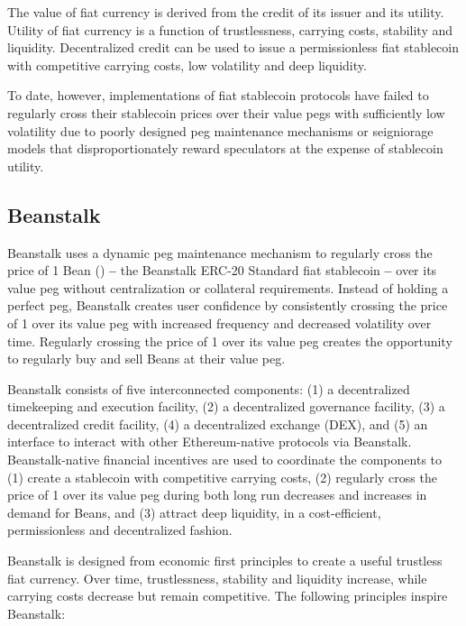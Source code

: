 \documentclass[tikz]{article}
\newcommand{\Bean}{} %
\begin{document}
The value of fiat currency is derived from the credit of its issuer and its utility. Utility of fiat currency is a function of trustlessness, carrying costs, stability and liquidity. Decentralized credit can be used to issue a permissionless fiat stablecoin with competitive carrying costs, low volatility and deep liquidity.

To date, however, implementations of fiat stablecoin protocols have failed to regularly cross their stablecoin prices over their value pegs with sufficiently low volatility due to poorly designed peg maintenance mechanisms or seigniorage models that disproportionately reward speculators at the expense of stablecoin utility. 


\subsection{Beanstalk}

Beanstalk uses a dynamic peg maintenance mechanism to regularly cross the price of 1 Bean (\Bean) \textbf{--} the Beanstalk ERC-20 Standard fiat stablecoin \textbf{--} over its value peg without centralization or collateral requirements. Instead of holding a perfect peg, Beanstalk creates user confidence by consistently crossing the price of \Bean1 over its value peg with increased frequency and decreased volatility over time. Regularly crossing the price of \Bean1 over its value peg creates the opportunity to regularly buy and sell Beans at their value peg.

Beanstalk consists of five interconnected components: (1) a decentralized timekeeping and execution facility, (2) a decentralized governance facility, (3) a decentralized credit facility, (4) a decentralized exchange (DEX), and (5) an interface to interact with other Ethereum-native protocols via Beanstalk. Beanstalk-native financial incentives are used to coordinate the components to (1) create a stablecoin with competitive carrying costs, (2) regularly cross the price of \Bean1 over its value peg during both long run decreases and increases in demand for Beans, and (3) attract deep liquidity, in a cost-efficient, permissionless and decentralized fashion.

Beanstalk is designed from economic first principles to create a useful trustless fiat currency. Over time, trustlessness, stability and liquidity increase, while carrying costs decrease but remain competitive. The following principles inspire Beanstalk:
\end{document}
